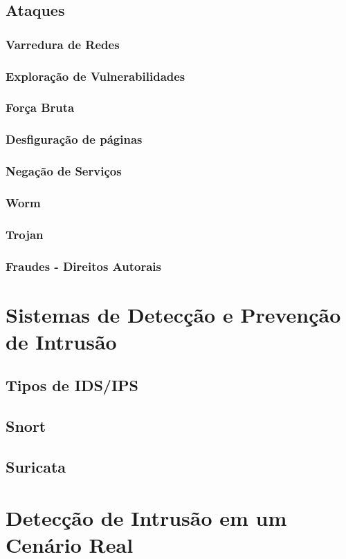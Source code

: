 \documentclass[
	12pt,				
	openright,		
	twoside,	
	a4paper,
	english,	
	brazil	
	]{abntex2}
\begin{document}
\section{Ataques}
\subsection{Varredura de Redes}
\subsection{Exploração de Vulnerabilidades}
\subsection{Força Bruta}
\subsection{Desfiguração de páginas}
\subsection{Negação de Serviços}
\subsection{Worm}
\subsection{Trojan}
\subsection{Fraudes - Direitos Autorais}
\chapter{Sistemas de Detecção e Prevenção de Intrusão}
\section{Tipos de IDS/IPS}
\section{Snort}
\section{Suricata}

\chapter{Detecção de Intrusão em um Cenário Real}
\end{document}
